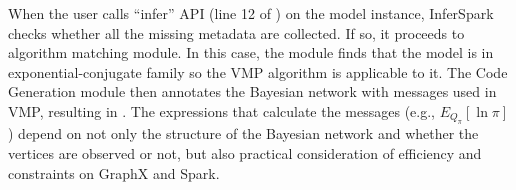 When the user calls ``{\sf infer}'' API (line 12 of
) on the model instance, InferSpark checks
whether all the missing metadata are collected. If so, it proceeds to
algorithm matching module. In this case, the module finds that the model is in
exponential-conjugate family so the VMP algorithm is applicable to it. The
Code Generation module then annotates the Bayesian network with messages used
in VMP, resulting in . The expressions that
calculate the messages (e.g., $E_{Q_\pi}[\ln \pi]$) depend on not only the
structure of the Bayesian network and whether the vertices are observed or
not, but also practical consideration of efficiency and constraints on GraphX and Spark.

%



